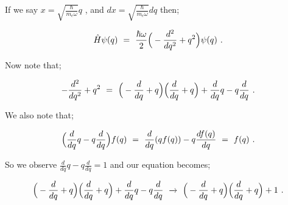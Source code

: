 \documentclass{article}
\begin{document}
If we say \begin{math} x = \sqrt{\frac{\hbar}{m_e \omega}} q \end{math} , and  \begin{math} dx = \sqrt{\frac{\hbar}{m_e \omega}} dq \end{math} then;

\begin{equation} \label{eq:256}
\hat{H}\psi(q) \hspace{0.125cm} = \hspace{0.125cm} \frac{\hbar \omega}{2} \Big( -\frac{d^2}{dq^2} + q^2 \Big) \psi(q) \hspace{0.125cm} .
\end{equation}

Now note that;

\begin{equation} \label{eq:256}
-\frac{d^2}{dq^2} + q^2 \hspace{0.125cm} = \hspace{0.125cm} \Big( -\frac{d}{dq} + q \Big) \Big( \frac{d}{dq} + q \Big) + \frac{d}{dq} q - q \frac{d}{dq} \hspace{0.125cm} .
\end{equation}

We also note that;

\begin{equation} \label{eq:256}
\Big( \frac{d}{dq} q - q \frac{d}{dq} \Big) f(q) \hspace{0.125cm} = \hspace{0.125cm} \frac{d}{dq} ( q f(q) ) - q \frac{d f(q)}{dq} \hspace{0.125cm} = \hspace{0.125cm} f(q) \hspace{0.125cm} .
\end{equation}

So we observe \begin{math} \frac{d}{dq} q - q \frac{d}{dq} = 1 \end{math} and our equation becomes;

\begin{equation} \label{eq:256}
\Big( -\frac{d}{dq} + q \Big) \Big( \frac{d}{dq} + q \Big) + \frac{d}{dq} q - q \frac{d}{dq} \hspace{0.125cm} \xrightarrow{} \hspace{0.125cm} \Big( -\frac{d}{dq} + q \Big) \Big( \frac{d}{dq} + q \Big) + 1 \hspace{0.125cm} .
\end{equation}
\end{document}
